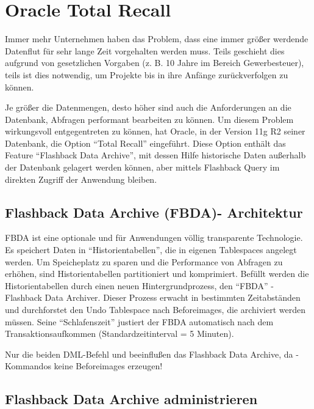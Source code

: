     \section{Oracle Total Recall}
      Immer mehr Unternehmen haben das Problem, dass eine immer größer werdende Datenflut für sehr lange Zeit vorgehalten werden muss. Teils geschieht dies aufgrund von gesetzlichen Vorgaben (z. B. 10 Jahre im Bereich Gewerbesteuer), teils ist dies notwendig, um Projekte bis in ihre Anfänge zurückverfolgen zu können.

      Je größer die Datenmengen, desto höher sind auch die Anforderungen an die Datenbank, Abfragen performant bearbeiten zu können. Um diesem Problem wirkungsvoll entgegentreten zu können, hat Oracle, in der Version 11g R2 seiner Datenbank, die Option \enquote{Total Recall} eingeführt. Diese Option enthält das Feature \enquote{Flashback Data Archive}, mit dessen Hilfe historische Daten außerhalb der Datenbank gelagert werden können, aber mittels Flashback Query im direkten Zugriff der Anwendung bleiben.
      \subsection{Flashback Data Archive (FBDA)- Architektur}
        FBDA ist eine optionale und für Anwendungen völlig transparente Technologie. Es speichert Daten in \enquote{Historientabellen}, die in eigenen Tablespaces angelegt werden. Um Speicheplatz zu sparen und die Performance von Abfragen zu erhöhen, sind Historientabellen partitioniert und komprimiert.
\clearpage
        Befüllt werden die Historientabellen durch einen neuen Hintergrundprozess, den \enquote{FBDA} - Flashback Data Archiver. Dieser Prozess erwacht in bestimmten Zeitabständen und durchforstet den Undo Tablespace nach Beforeimages, die archiviert werden müssen. Seine \enquote{Schlafenszeit} justiert der FBDA automatisch nach dem Transaktionsaufkommen (Standardzeitinterval = 5 Minuten).
        \begin{merke}
          Nur die beiden DML-Befehl  und  beeinflußen das Flashback Data Archive, da -Kommandos keine Beforeimages erzeugen!
        \end{merke}
      \subsection{Flashback Data Archive administrieren}
